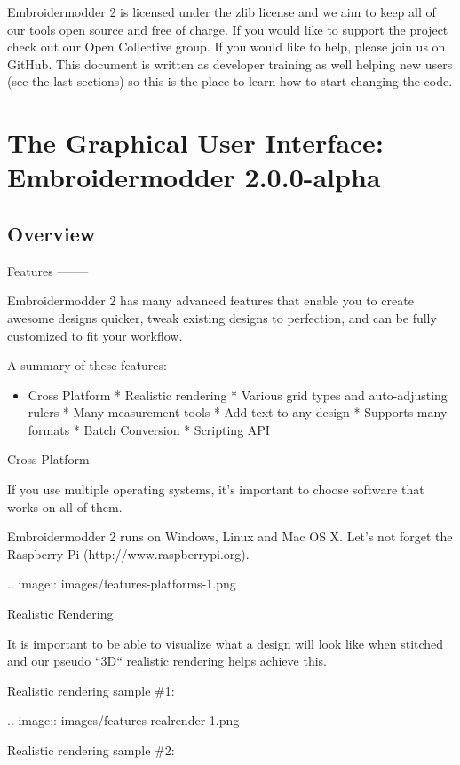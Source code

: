 \documentclass[a4paper]{report}
\begin{document}
Embroidermodder 2 is licensed under the zlib license and we aim to keep all of
our tools open source and free of charge. If you would like to support the
project check out our Open Collective group. If you would like to help, please
join us on GitHub. This document is written as developer training as well
helping new users (see the last sections) so this is the place to learn how
to start changing the code.

\chapter{The Graphical User Interface: Embroidermodder 2.0.0-alpha}

\section{Overview}

Features
--------

Embroidermodder 2 has many advanced features that enable you to create awesome designs quicker, tweak existing designs to perfection, and can be fully customized to fit your workflow.

A summary of these features:

\begin{itemize}
\item Cross Platform
* Realistic rendering
* Various grid types and auto-adjusting rulers
* Many measurement tools
* Add text to any design
* Supports many formats
* Batch Conversion
* Scripting API
\end{itemize}

Cross Platform
~~~~~~~~~~~~~~

If you use multiple operating systems, it's important to choose software that works on all of them.

Embroidermodder 2 runs on Windows, Linux and Mac OS X. Let's not forget the Raspberry Pi (http://www.raspberrypi.org).

.. image::
   images/features-platforms-1.png

Realistic Rendering
~~~~~~~~~~~~~~~~~~~

It is important to be able to visualize what a design will look like when stitched and our pseudo ``3D`` realistic rendering helps achieve this.

Realistic rendering sample \#1:

.. image::
   images/features-realrender-1.png

Realistic rendering sample \#2:
\end{document}
